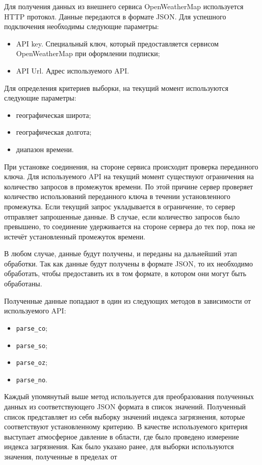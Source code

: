 Для получения данных из внешнего сервиса OpenWeatherMap используется HTTP протокол.
Данные передаются в формате JSON.
Для успешного подключения необходимы следующие параметры:
\begin{itemize}
    \item API key. Специальный ключ, который предоставляется сервисом OpenWeatherMap при оформлении подписки;
    \item API Url. Адрес используемого API.
\end{itemize}

Для определения критериев выборки, на текущий момент используются следующие параметры:
\begin{itemize}
    \item географическая широта;
    \item географическая долгота;
    \item диапазон времени.
\end{itemize}

При установке соединения, на стороне сервиса происходит проверка переданного ключа.
Для используемого API на текущий момент существуют ограничения на количество запросов в промежуток времени.
По этой причине сервер проверяет количество использований переданного ключа в течении установленного промежутка.
Если текущий запрос укладывается в ограничение, то сервер отправляет запрошенные данные.
В случае, если количество запросов было превышено, то соединение удерживается на стороне сервера до тех пор, пока не истечёт установленный промежуток времени.


В любом случае, данные будут получены, и переданы на дальнейший этап обработки.
Так как данные будут получены в формате JSON, то их необходимо обработать, чтобы предоставить их в том формате, в котором они могут быть обработаны.

Полученные данные попадают в один из следующих методов в зависимости от используемого API:
\begin{itemize}
    \item \texttt{parse\_co};
    \item \texttt{parse\_so};
    \item \texttt{parse\_oz};
    \item \texttt{parse\_no}.
\end{itemize}

Каждый упомянутый выше метод используется для преобразования полученных данных из соответствующего JSON формата в список значений.
Полученный список представляет из себя выборку значений индекса загрязнения, которые соответствуют установленному критерию.
В качестве используемого критерия выступает атмосферное давление в области, где было проведено измерение индекса загрязнения.
Как было указано ранее, для выборки используются значения, полученные в пределах от %

